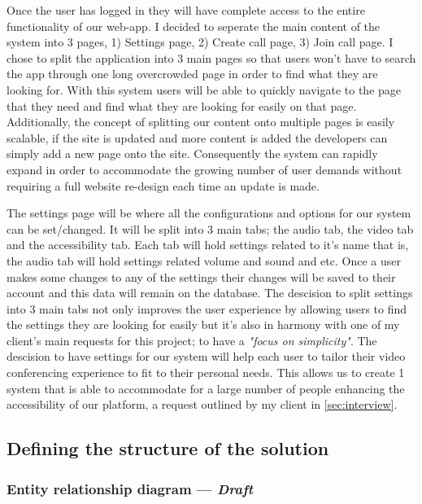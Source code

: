 Once the user has logged in they will have complete access to 
the entire functionality of our web-app. I decided to seperate
the main content of the system into 3 pages, 1) Settings page,
2) Create call page, 3) Join call page. I chose to split the 
application into 3 main pages so that users won't have to 
search the app through one long overcrowded page in order to 
find what they are looking for. With this system users will be
able to quickly navigate to the page that they need and find 
what they are looking for easily on that page. Additionally, 
the concept of splitting our content onto multiple pages is 
easily scalable, if the site is updated and more content is 
added the developers can simply add a new page onto the site.
Consequently the system can rapidly expand in order to 
accommodate the growing number of user demands without
requiring a full website re-design each time an update is 
made. \\ \vspace{0.2cm}

The settings page will be where all the configurations and 
options for our system can be set/changed. It will be split
into 3 main tabs; the audio tab, the video tab and the 
accessibility tab. Each tab will hold settings related to it's
name that is, the audio tab will hold settings related volume
and sound and etc. Once a user makes some changes to any of the
settings their changes will be saved to their account and this 
data will remain on the database. The descision to split 
settings into 3 main tabs not only improves the user experience
by allowing users to find the settings they are looking for
easily but it's also in harmony with one of my client's main 
requests for this project; to have a \textit{"focus on 
simplicity"}. The descision to have settings for our system
will help each user to tailor their video conferencing
experience to fit to their personal needs. This allows us to 
create 1 system that is able to accommodate for a large 
number of people enhancing the accessibility of our platform, 
a request outlined by my client in \ref{sec:interview}. 

\newpage
\subsection{Defining the structure of the solution}

\subsubsection{Entity relationship diagram — \textit{Draft}}
\label{sec:erdd}

